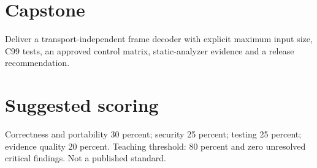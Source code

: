 \documentclass[10pt,letterpaper]{article}
\begin{document}
\section{Capstone}
Deliver a transport-independent frame decoder with explicit maximum input size, C99 tests, an approved control matrix, static-analyzer evidence and a release recommendation.
\section{Suggested scoring}
Correctness and portability 30 percent; security 25 percent; testing 25 percent; evidence quality 20 percent. Teaching threshold: 80 percent and zero unresolved critical findings. Not a published standard.
\end{document}
